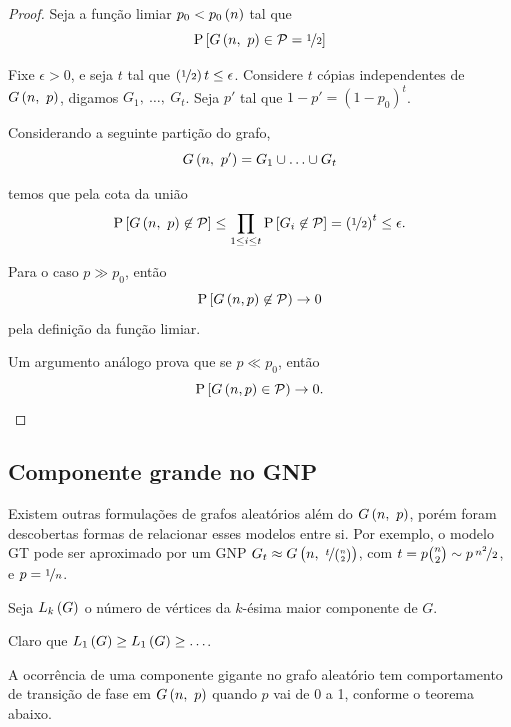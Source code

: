 \begin{proof}
  Seja a função limiar $p_0<p_0\left(n\vphantom{1j}\right)$ tal que
  \[
    \mathrm{P}\left[G\left(n,\ p\vphantom{1j}\right)\in\mathcal{P} = \nicefrac{1}{2}\vphantom{1j}\right]
  \]

  Fixe $\epsilon>0$, e seja $t$ tal que $\left(\nicefrac{1}{2}\vphantom{1j}\right)t\leq\epsilon$. Considere $t$ cópias independentes de $G\left(n,\ p\vphantom{1j}\right)$, digamos $G_1,\ \ldots,\ G_t$. Seja $p'$ tal que $1-p'=(1-p_0)^t$.

  Considerando a seguinte partição do grafo,
  \[
    G\left(n,\ p'\vphantom{1j}\right) = G_1\cup\ldots\cup G_t
  \]

  temos que pela cota da união
  \[
    \mathrm{P}\left[G\left(n,\ p\vphantom{1j}\right)\not\in\mathcal{P}\vphantom{1j}\right]
      \leq \prod_{1\leq i\leq t} \mathrm{P}\left[G_i\not\in\mathcal{P}\vphantom{1j}\right]
      = \left(\nicefrac{1}{2}\vphantom{1j}\right)^t
      \leq \epsilon.
  \]

  Para o caso $p\gg p_0$, então
  \[
    \mathrm{P}\left[G\left(n, p\vphantom{1j}\right)\not\in\mathcal{P}\vphantom{1j}\right) \rightarrow 0
  \]
  pela definição da função limiar.

  Um argumento análogo prova que se $p\ll p_0$, então
  \[
    \mathrm{P}\left[G\left(n, p\vphantom{1j}\right)\in\mathcal{P}\vphantom{1j}\right) \rightarrow 0.
  \]
\end{proof}

\subsection{Componente grande no GNP}

Existem outras formulações de grafos aleatórios além do $G\left(n,\ p\vphantom{1j}\right)$, porém foram descobertas formas de relacionar esses modelos entre si. Por exemplo, o modelo GT pode ser aproximado por um GNP $G_t\approx G\left(n,\ \nicefrac{t}{\binom{n}{2}}\vphantom{1j}\right)$, com $t=p\binom{n}{2}\sim p\,\nicefrac{n^2}{2}$, e $p=\nicefrac{1}{n}$.

Seja $L_k\left(G\vphantom{1j}\right)$ o número de vértices da $k$-ésima maior componente de $G$.

Claro que $L_1\left(G\vphantom{1j}\right)\geq L_1\left(G\vphantom{1j}\right)\geq\ldots$.

A ocorrência de uma componente gigante no grafo aleatório tem comportamento de transição de fase em $G\left(n,\ p\vphantom{1j}\right)$ quando $p$ vai de 0 a 1, conforme o teorema abaixo.

